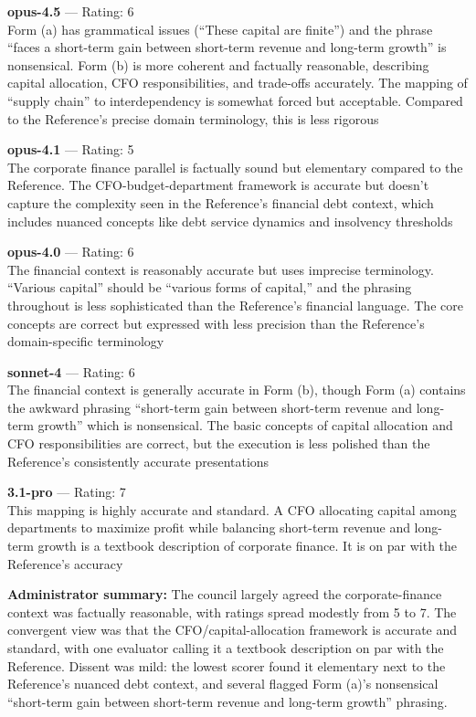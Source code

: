 \textbf{opus-4.5} --- Rating: 6\\
Form (a) has grammatical issues (``These capital are finite'') and the phrase ``faces a short-term gain between short-term revenue and long-term growth'' is nonsensical. Form (b) is more coherent and factually reasonable, describing capital allocation, CFO responsibilities, and trade-offs accurately. The mapping of ``supply chain'' to interdependency is somewhat forced but acceptable. Compared to the Reference's precise domain terminology, this is less rigorous

\textbf{opus-4.1} --- Rating: 5\\
The corporate finance parallel is factually sound but elementary compared to the Reference. The CFO-budget-department framework is accurate but doesn't capture the complexity seen in the Reference's financial debt context, which includes nuanced concepts like debt service dynamics and insolvency thresholds

\textbf{opus-4.0} --- Rating: 6\\
The financial context is reasonably accurate but uses imprecise terminology. ``Various capital'' should be ``various forms of capital,'' and the phrasing throughout is less sophisticated than the Reference's financial language. The core concepts are correct but expressed with less precision than the Reference's domain-specific terminology

\textbf{sonnet-4} --- Rating: 6\\
The financial context is generally accurate in Form (b), though Form (a) contains the awkward phrasing ``short-term gain between short-term revenue and long-term growth'' which is nonsensical. The basic concepts of capital allocation and CFO responsibilities are correct, but the execution is less polished than the Reference's consistently accurate presentations

\textbf{3.1-pro} --- Rating: 7\\
This mapping is highly accurate and standard. A CFO allocating capital among departments to maximize profit while balancing short-term revenue and long-term growth is a textbook description of corporate finance. It is on par with the Reference's accuracy

\textbf{Administrator summary:} The council largely agreed the corporate-finance context was factually reasonable, with ratings spread modestly from 5 to 7. The convergent view was that the CFO/capital-allocation framework is accurate and standard, with one evaluator calling it a textbook description on par with the Reference. Dissent was mild: the lowest scorer found it elementary next to the Reference's nuanced debt context, and several flagged Form (a)'s nonsensical ``short-term gain between short-term revenue and long-term growth'' phrasing.

